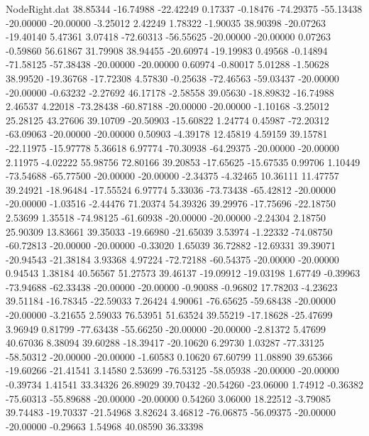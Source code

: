 \begin{filecontents}{NodeRight.dat}
  38.85344  -16.74988  -22.42249     0.17337   -0.18476  -74.29375  -55.13438  -20.00000  -20.00000   -3.25012    2.42249    1.78322   -1.90035
  38.90398  -20.07263  -19.40140     5.47361    3.07418  -72.60313  -56.55625  -20.00000  -20.00000    0.07263   -0.59860   56.61867   31.79908
  38.94455  -20.60974  -19.19983     0.49568   -0.14894  -71.58125  -57.38438  -20.00000  -20.00000    0.60974   -0.80017    5.01288   -1.50628
  38.99520  -19.36768  -17.72308     4.57830   -0.25638  -72.46563  -59.03437  -20.00000  -20.00000   -0.63232   -2.27692   46.17178   -2.58558
  39.05630  -18.89832  -16.74988     2.46537    4.22018  -73.28438  -60.87188  -20.00000  -20.00000   -1.10168   -3.25012   25.28125   43.27606
  39.10709  -20.50903  -15.60822     1.24774    0.45987  -72.20312  -63.09063  -20.00000  -20.00000    0.50903   -4.39178   12.45819    4.59159
  39.15781  -22.11975  -15.97778     5.36618    6.97774  -70.30938  -64.29375  -20.00000  -20.00000    2.11975   -4.02222   55.98756   72.80166
  39.20853  -17.65625  -15.67535     0.99706    1.10449  -73.54688  -65.77500  -20.00000  -20.00000   -2.34375   -4.32465   10.36111   11.47757
  39.24921  -18.96484  -17.55524     6.97774    5.33036  -73.73438  -65.42812  -20.00000  -20.00000   -1.03516   -2.44476   71.20374   54.39326
  39.29976  -17.75696  -22.18750     2.53699    1.35518  -74.98125  -61.60938  -20.00000  -20.00000   -2.24304    2.18750   25.90309   13.83661
  39.35033  -19.66980  -21.65039     3.53974   -1.22332  -74.08750  -60.72813  -20.00000  -20.00000   -0.33020    1.65039   36.72882  -12.69331
  39.39071  -20.94543  -21.38184     3.93368    4.97224  -72.72188  -60.54375  -20.00000  -20.00000    0.94543    1.38184   40.56567   51.27573
  39.46137  -19.09912  -19.03198     1.67749   -0.39963  -73.94688  -62.33438  -20.00000  -20.00000   -0.90088   -0.96802   17.78203   -4.23623
  39.51184  -16.78345  -22.59033     7.26424    4.90061  -76.65625  -59.68438  -20.00000  -20.00000   -3.21655    2.59033   76.53951   51.63524
  39.55219  -17.18628  -25.47699     3.96949    0.81799  -77.63438  -55.66250  -20.00000  -20.00000   -2.81372    5.47699   40.67036    8.38094
  39.60288  -18.39417  -20.10620     6.29730    1.03287  -77.33125  -58.50312  -20.00000  -20.00000   -1.60583    0.10620   67.60799   11.08890
  39.65366  -19.60266  -21.41541     3.14580    2.53699  -76.53125  -58.05938  -20.00000  -20.00000   -0.39734    1.41541   33.34326   26.89029
  39.70432  -20.54260  -23.06000     1.74912   -0.36382  -75.60313  -55.89688  -20.00000  -20.00000    0.54260    3.06000   18.22512   -3.79085
  39.74483  -19.70337  -21.54968     3.82624    3.46812  -76.06875  -56.09375  -20.00000  -20.00000   -0.29663    1.54968   40.08590   36.33398

\end{filecontents}
